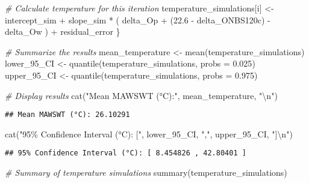 \documentclass[
]{article}
\newenvironment{Shaded}{\begin{snugshade}}{\end{snugshade}}
\newcommand{\AttributeTok}[1]{\textcolor[rgb]{0.77,0.63,0.00}{#1}}
\newcommand{\CommentTok}[1]{\textcolor[rgb]{0.56,0.35,0.01}{\textit{#1}}}
\newcommand{\FloatTok}[1]{\textcolor[rgb]{0.00,0.00,0.81}{#1}}
\newcommand{\FunctionTok}[1]{\textcolor[rgb]{0.00,0.00,0.00}{#1}}
\newcommand{\NormalTok}[1]{#1}
\newcommand{\OtherTok}[1]{\textcolor[rgb]{0.56,0.35,0.01}{#1}}
\newcommand{\SpecialCharTok}[1]{\textcolor[rgb]{0.00,0.00,0.00}{#1}}
\newcommand{\StringTok}[1]{\textcolor[rgb]{0.31,0.60,0.02}{#1}}
\begin{document}
\begin{Shaded}
\begin{Highlighting}[]
  \CommentTok{\# Calculate temperature for this iteration}
\NormalTok{  temperature\_simulations[i] }\OtherTok{\textless{}{-}}\NormalTok{ intercept\_sim }\SpecialCharTok{+}\NormalTok{ slope\_sim }\SpecialCharTok{*}\NormalTok{ (}
\NormalTok{    delta\_Op }\SpecialCharTok{+}\NormalTok{ (}\FloatTok{22.6} \SpecialCharTok{{-}}\NormalTok{ delta\_ONBS120c) }\SpecialCharTok{{-}}\NormalTok{ delta\_Ow}
\NormalTok{  ) }\SpecialCharTok{+}\NormalTok{ residual\_error}
\NormalTok{\}}

\CommentTok{\# Summarize the results}
\NormalTok{mean\_temperature }\OtherTok{\textless{}{-}} \FunctionTok{mean}\NormalTok{(temperature\_simulations)}
\NormalTok{lower\_95\_CI }\OtherTok{\textless{}{-}} \FunctionTok{quantile}\NormalTok{(temperature\_simulations, }\AttributeTok{probs =} \FloatTok{0.025}\NormalTok{)}
\NormalTok{upper\_95\_CI }\OtherTok{\textless{}{-}} \FunctionTok{quantile}\NormalTok{(temperature\_simulations, }\AttributeTok{probs =} \FloatTok{0.975}\NormalTok{)}

\CommentTok{\# Display results}
\FunctionTok{cat}\NormalTok{(}\StringTok{"Mean MAWSWT (°C):"}\NormalTok{, mean\_temperature, }\StringTok{"}\SpecialCharTok{\textbackslash{}n}\StringTok{"}\NormalTok{)}
\end{Highlighting}
\end{Shaded}

\begin{verbatim}
## Mean MAWSWT (°C): 26.10291
\end{verbatim}

\begin{Shaded}
\begin{Highlighting}[]
\FunctionTok{cat}\NormalTok{(}\StringTok{"95\% Confidence Interval (°C): ["}\NormalTok{, lower\_95\_CI, }\StringTok{","}\NormalTok{, upper\_95\_CI, }\StringTok{"]}\SpecialCharTok{\textbackslash{}n}\StringTok{"}\NormalTok{)}
\end{Highlighting}
\end{Shaded}

\begin{verbatim}
## 95% Confidence Interval (°C): [ 8.454826 , 42.80401 ]
\end{verbatim}

\begin{Shaded}
\begin{Highlighting}[]
\CommentTok{\# Summary of temperature simulations}
\FunctionTok{summary}\NormalTok{(temperature\_simulations)}
\end{Highlighting}
\end{Shaded}
\end{document}
